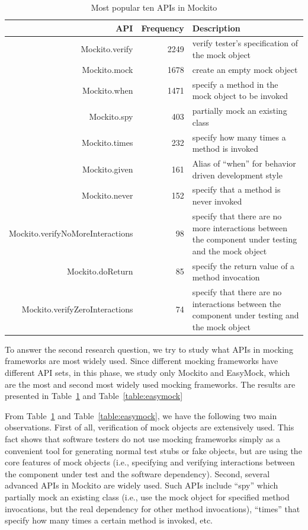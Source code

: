 \begin{table}
\caption{Most popular ten APIs in Mockito}

\label{table:mockito}
\centering
\begin{tabular}{|r|r|p{3.5in}|}
\hline
API & Frequency & Description\\
\hline
Mockito.verify&2249 & verify tester's specification of the mock object\\
Mockito.mock&1678 & create an empty mock object\\
Mockito.when&1471 & specify a method in the mock object to be invoked\\
Mockito.spy&403      & partially mock an existing class\\
Mockito.times&232   & specify how many times a method is invoked\\
Mockito.given&161   & Alias of ``when'' for behavior driven development style\\
Mockito.never&152  & specify that a method is never invoked\\
Mockito.verifyNoMoreInteractions & 98 & specify that there are no more interactions between the component under testing and the mock object\\ 
Mockito.doReturn & 85 & specify the return value of a method invocation\\
Mockito.verifyZeroInteractions & 74 & specify that there are no interactions between the component under testing and the mock object\\ 
\hline
\end{tabular}

\end{table}



To answer the second research question, we try to study what APIs in mocking frameworks are most widely used. Since different mocking frameworks have different API sets, in this phase, we study only Mockito and EasyMock, which are the most and second most widely used mocking frameworks. The results are presented in Table~\ref{table:mockito} and Table~\ref{table:easymock}


From Table~\ref{table:mockito} and Table~\ref{table:easymock}, we have the following two main observations. First of all, verification of mock objects are extensively used. This fact shows that software testers do not use mocking frameworks simply as a convenient tool for generating normal test stubs or fake objects, but are using the core features of mock objects (i.e., specifying and verifying interactions between the component under test and the software dependency). Second, several advanced APIs in Mockito are widely used. Such APIs include ``spy'' which partially mock an existing class (i.e., use the mock object for specified method invocations, but the real dependency for other method invocations), ``times'' that specify how many times a certain method is invoked, etc. 

